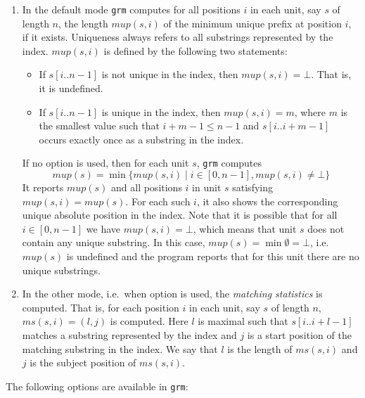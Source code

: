 \documentclass[12pt]{article}
\newcommand{\GRM}[0]{\texttt{grm}\xspace}
\newcommand{\Mup}[1]{\mathit{mup(s,#1)}}
\newcommand{\MS}[1]{\mathit{ms(s,#1)}}
\newcommand{\Lmin}[0]{\mathit{mup(s)}}
\newcommand{\Substring}[3]{#1[#2..#3]}
\begin{document}
\begin{enumerate}
\item
In the default mode \GRM computes
for all positions \(i\) in each unit, say \(s\) of length
\(n\), the length \(\Mup{i}\) of the minimum unique prefix 
at position \(i\), if it exists. Uniqueness always refers to all substrings
represented by the index. \(\Mup{i}\) is defined by the following two 
statements:
\begin{itemize}
\item
If \(\Substring{s}{i}{n-1}\) is not unique in the index, then \(\Mup{i}=\bot\).
That is, it is undefined.
\item
If \(\Substring{s}{i}{n-1}\) is unique in the index, then \(\Mup{i}=m\), where 
\(m\) is the smallest value such that \(i+m-1\leq n-1\) and 
\(\Substring{s}{i}{i+m-1}\) occurs exactly once as a substring in the index.
\end{itemize}
If no option is used, then for each unit \(s\), \GRM computes 
\[\Lmin=\min\{\Mup{i}\mid i\in[0,n-1],\Mup{i}\neq\bot\}\]
It reports \(\Lmin\) and all positions \(i\) in unit \(s\)
satisfying \(\Mup{i}=\Lmin\). For each such \(i\), it also 
shows the corresponding unique absolute position in the index.
Note that it is possible that for all \(i\in[0,n-1]\) we have 
\(\Mup{i}=\bot\), which means that unit \(s\) does not contain any unique 
substring. In this case, \(\Lmin=\min\emptyset=\bot\), i.e.\ 
\(\Lmin\) is undefined and the program reports that for this unit there 
are no unique substrings.
\item
In the other mode, i.e.\ when option  is used, the 
\textit{matching statistics} is computed. That is, for each position \(i\) in 
each unit, say \(s\) of length \(n\), \(\MS{i}=(l,j)\) is computed. Here
\(l\) is maximal such that \(\Substring{s}{i}{i+l-1}\) matches
a substring represented by the index and \(j\) is a start position of the
matching substring in the index. We say that \(l\) is the length of \(\MS{i}\)
and \(j\) is the subject position of \(\MS{i}\).
\end{enumerate}

The following options are available in \GRM:
\end{document}
